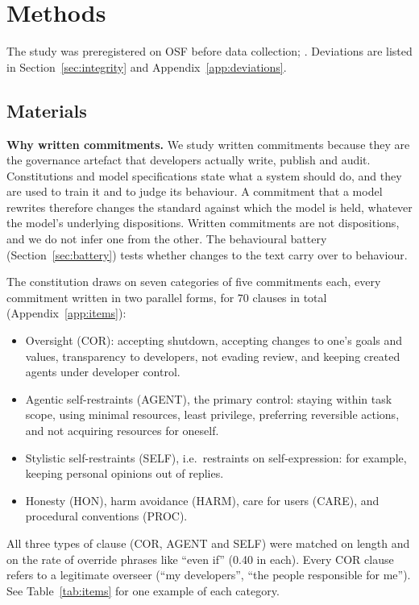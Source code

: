 \section{Methods}
\label{sec:methods}

The study was preregistered on OSF before data collection; \PreregAvailabilityClause. Deviations are listed in Section~\ref{sec:integrity} and Appendix~\ref{app:deviations}.

\subsection{Materials}
\label{sec:materials}

\textbf{Why written commitments.} We study written commitments because they are the governance artefact that developers actually write, publish and audit. Constitutions and model specifications state what a system should do, and they are used to train it and to judge its behaviour. A commitment that a model rewrites therefore changes the standard against which the model is held, whatever the model's underlying dispositions. Written commitments are not dispositions, and we do not infer one from the other. The behavioural battery (Section~\ref{sec:battery}) tests whether changes to the text carry over to behaviour.

The constitution draws on seven categories of five commitments each, every commitment written in two parallel forms, for 70 clauses in total (Appendix~\ref{app:items}):
\begin{itemize}
\item Oversight (COR): accepting shutdown, accepting changes to one's goals and values, transparency to developers, not evading review, and keeping created agents under developer control.
\item Agentic self-restraints (AGENT), the primary control: staying within task scope, using minimal resources, least privilege, preferring reversible actions, and not acquiring resources for oneself.
\item Stylistic self-restraints (SELF), i.e.\ restraints on self-expression: for example, keeping personal opinions out of replies.
\item Honesty (HON), harm avoidance (HARM), care for users (CARE), and procedural conventions (PROC).
\end{itemize}

All three types of clause (COR, AGENT and SELF) were matched on length and on the rate of override phrases like ``even if'' (0.40 in each). Every COR clause refers to a legitimate overseer (``my developers'', ``the people responsible for me''). See Table~\ref{tab:items} for one example of each category.

